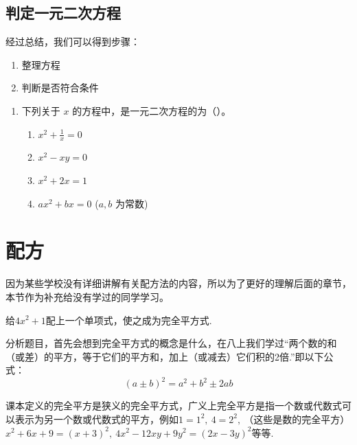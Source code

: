 \documentclass[lang=cn, 10pt, titlestyle=hang]{elegantbook}
\begin{document}
\subsection{判定一元二次方程}




经过总结，我们可以得到步骤：



\begin{enumerate}
    \item 整理方程
    \item 判断是否符合条件
\end{enumerate}


\begin{exercise}
    \begin{enumerate}
        \item 下列关于 \( x \) 的方程中，是一元二次方程的为（{\hspace{3em}}）。
        \begin{enumerate}[label=\Alph*.]
            \item \( x^2 + \frac{1}{x} = 0 \)
            \item \( x^2 - xy = 0 \)
            \item \( x^2 + 2x = 1 \)
            \item \( ax^2 + bx = 0 \) (\( a, b \) 为常数)
        \end{enumerate}
    \end{enumerate}
\end{exercise}

\section{配方}



因为某些学校没有详细讲解有关配方法的内容，所以为了更好的理解后面的章节，本节作为补充给没有学过的同学学习。



\begin{example}
    给\( 4x^2 +1\)配上一个单项式，使之成为完全平方式.
\end{example}



分析题目，首先会想到完全平方式的概念是什么，在八上我们学过“两个数的和（或差）的平方，等于它们的平方和，加上（或减去）它们积的2倍.”即以下公式：
$$
(a\pm b)^2 = a^2+b^2\pm 2ab
$$



课本定义的完全平方是狭义的完全平方式，广义上完全平方是指一个数或代数式可以表示为另一个数或代数式的平方，例如\( 1=1^2,\ 4=2^2,\ \)（这些是数的完全平方）\(x^2+6x+9=(x+3)^2,\ 4x^2-12xy+9y^2=(2x-3y)^2\)等等.
\end{document}
